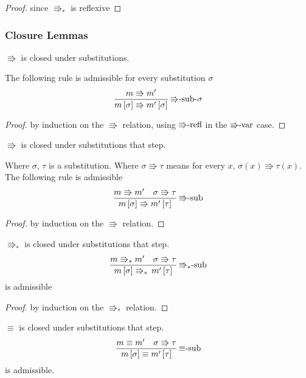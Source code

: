 \begin{proof}
since $\Rrightarrow_{\ast}$ is reflexive
\end{proof}

\subsubsection{Closure Lemmas}
\begin{lem}
$\Rrightarrow$ is closed under substitutions.

The following rule is admissible for every substitution $\sigma$
\[
\frac{m\Rrightarrow m'}{m\left[\sigma\right]\Rrightarrow m'\left[\sigma\right]}\,\textrm{\ensuremath{\Rrightarrow}-sub-\ensuremath{\sigma}}
\]
\end{lem}


\begin{proof}
by induction on the $\Rrightarrow$ relation, using $\textrm{\ensuremath{\Rrightarrow}-refl}$
in the $\textrm{\ensuremath{\Rrightarrow}-var}$ case.
\end{proof}
\begin{lem}
$\Rrightarrow$ is closed under substitutions that step.

Where $\sigma$, $\tau$ is a substitution.
Where $\sigma\Rrightarrow\tau$ means for every $x$, $\sigma\left(x\right)\Rrightarrow\tau\left(x\right)$.
The following rule is admissible
\[
\frac{m\Rrightarrow m'\quad\sigma\Rrightarrow\tau}{m\left[\sigma\right]\Rrightarrow m'\left[\tau\right]}\,\textrm{\ensuremath{\Rrightarrow}-sub}
\]
\end{lem}

\begin{proof}
by induction on the $\Rrightarrow$ relation.
\end{proof}
\begin{lem}
$\Rrightarrow_{\ast}$ is closed under substitutions that step.
\[
\frac{m\Rrightarrow_{\ast}m'\quad\sigma\Rrightarrow\tau}{m\left[\sigma\right]\Rrightarrow_{\ast}\,m'\left[\tau\right]}\,\textrm{\ensuremath{\Rrightarrow_{\ast}}-sub}
\]
is admissible 
\end{lem}

\begin{proof}
by induction on the $\Rrightarrow_{\ast}$ relation. 
\end{proof}
\begin{lem}
$\equiv$ is closed under substitutions that step.
\[
\frac{m\equiv m'\quad\sigma\Rrightarrow\tau}{m\left[\sigma\right]\equiv m'\left[\tau\right]}\,\textrm{\ensuremath{\equiv}-sub}
\]
is admissible.
\end{lem}

